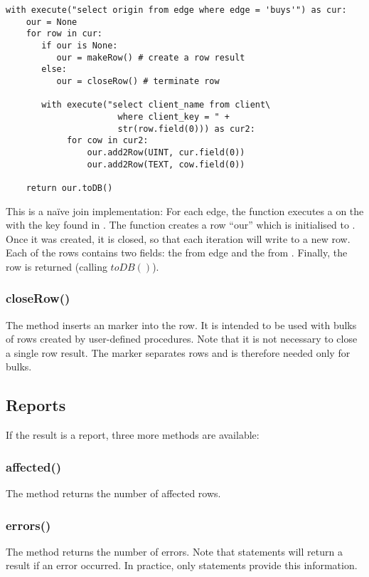 \begin{python}
\begin{lstlisting}
with execute("select origin from edge where edge = 'buys'") as cur:
    our = None
    for row in cur:
       if our is None:
          our = makeRow() # create a row result
       else:
          our = closeRow() # terminate row

       with execute("select client_name from client\
                      where client_key = " +
                      str(row.field(0))) as cur2:
            for cow in cur2:
                our.add2Row(UINT, cur.field(0))
                our.add2Row(TEXT, cow.field(0))

    return our.toDB() 
\end{lstlisting}
\end{python}

This is a na\"ive join implementation:
For each edge, the function executes a 
on the  with the key found in .
The function creates a row ``our'' which is initialised
to . Once it was created, it is closed,
so that each iteration will write to a new row.
Each of the rows contains two fields: the 
from edge and the  from .
Finally, the row is returned (calling $toDB()$).

\subsubsection{closeRow()}
The method inserts an  marker into the row.
It is intended to be used with bulks of rows created by
user-defined procedures. Note that it is not necessary
to close a single row result. The marker separates
rows and is therefore needed only for bulks.

\subsection{Reports}
If the result is a report,
three more methods are available:

\subsubsection{affected()}
The method returns the number of affected rows.

\subsubsection{errors()}
The method returns the number of errors.
Note that  statements will
return a  result if an error occurred.
In practice, only  statements provide
this information.

